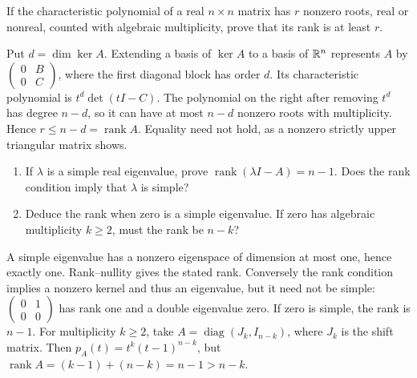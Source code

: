 \begin{problem}\label{ex:08:rank-bound}
If the characteristic polynomial of a real \(n\times n\) matrix has
\(r\) nonzero roots, real or nonreal, counted with algebraic multiplicity,
prove that its rank is at least \(r\).
\end{problem}
\begin{solution}
Put \(d=\dim\ker A\). Extending a basis of \(\ker A\) to a basis of
\(\mathbb R^n\) represents \(A\) by
\(\begin{pmatrix}0&B\\0&C\end{pmatrix}\), where the first diagonal
block has order \(d\). Its characteristic polynomial is
\(t^d\det(tI-C)\). The polynomial on the right after removing \(t^d\)
has degree \(n-d\), so it can have at most \(n-d\) nonzero roots
with multiplicity. Hence \(r\leqslant n-d=\operatorname{rank}A\).
Equality need not hold, as a nonzero strictly upper triangular matrix shows.
\end{solution}

\begin{problem}\label{ex:08:simple-rank}
\begin{enumerate}
\item If \(\lambda\) is a simple real eigenvalue, prove
\(\operatorname{rank}(\lambda I-A)=n-1\). Does the rank condition
imply that \(\lambda\) is simple?
\item Deduce the rank when zero is a simple eigenvalue.
If zero has algebraic multiplicity \(k\geqslant2\), must the rank be \(n-k\)?
\end{enumerate}
\end{problem}
\begin{solution}
A simple eigenvalue has a nonzero eigenspace of dimension at most one,
hence exactly one. Rank--nullity gives the stated rank.
Conversely the rank condition implies a nonzero kernel and thus an
eigenvalue, but it need not be simple:
\(\begin{pmatrix}0&1\\0&0\end{pmatrix}\) has rank one and a double
eigenvalue zero.
If zero is simple, the rank is \(n-1\).
For multiplicity \(k\geqslant2\), take
\(A=\operatorname{diag}(J_k,I_{n-k})\), where \(J_k\) is the shift matrix.
Then \(p_A(t)=t^k(t-1)^{n-k}\), but
\(\operatorname{rank}A=(k-1)+(n-k)=n-1>n-k\).
\end{solution}

